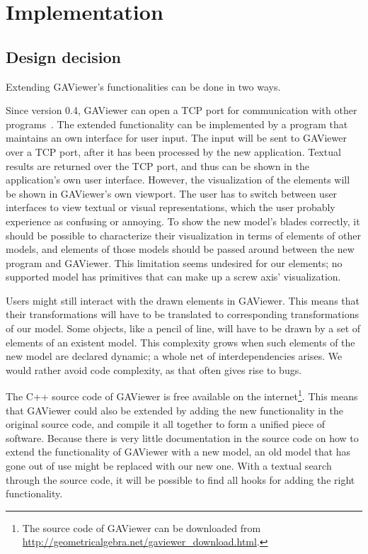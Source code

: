 \section{Implementation}
\label{ch:implementation}


\subsection{Design decision}
Extending GAViewer's functionalities can be done in two ways.  

Since version 0.4, GAViewer can open a TCP port for communication with other programs~\cite{GAViewer}.  The extended functionality can be implemented by a program that maintains an own interface for user input.  The input will be sent to GAViewer over a TCP port, after it has been processed by the new application.  Textual results are returned over the TCP port, and thus can be shown in the application's own user interface.  However, the visualization of the elements will be shown in GAViewer's own viewport.  The user has to switch between user interfaces to view textual or visual representations, which the user probably experience as confusing or annoying.  To show the new model's blades correctly, it should be possible to characterize their visualization in terms of elements of other models, and elements of those models should be passed around between the new program and GAViewer.  This limitation seems undesired for our elements; no supported model has primitives that can make up a screw axis' visualization.  

Users might still interact with the drawn elements in GAViewer.  This means that their transformations will have to be translated to corresponding transformations of our model.  Some objects, like a pencil of line, will have to be drawn by a set of elements of an existent model.  This complexity grows when such elements of the new model are declared dynamic; a whole net of interdependencies arises.  We would rather avoid code complexity, as that often gives rise to bugs.

The C++ source code of GAViewer is free available on the internet\footnote{The source code of GAViewer can be downloaded from \url{http://geometricalgebra.net/gaviewer\_download.html}.}.  This means that GAViewer could also be extended by adding the new functionality in the original source code, and compile it all together to form a unified piece of software.  Because there is very little documentation in the source code on how to extend the functionality of GAViewer with a new model, an old model that has gone out of use might be replaced with our new one.  With a textual search through the source code, it will be possible to find all hooks for adding the right functionality.  

